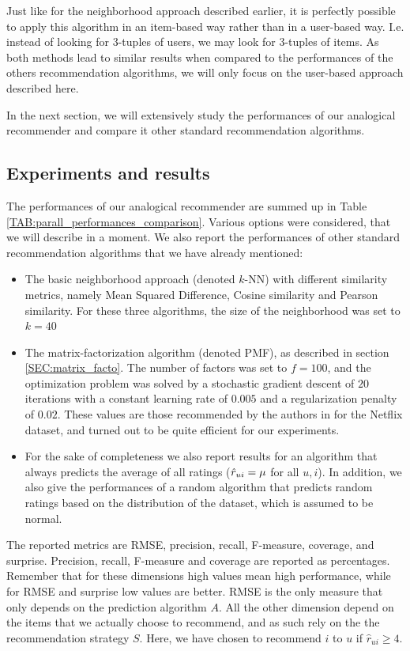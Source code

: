 Just like for the neighborhood approach described earlier, it is perfectly
possible to apply this algorithm in an item-based way rather
than in a user-based way. I.e. instead of looking for $3$-tuples of users, we
may look for $3$-tuples of items.  As both methods lead to similar results when
compared to
the performances of the others recommendation algorithms, we
will only focus on the user-based approach described here.

In the next section, we will extensively study the performances of our
analogical recommender and compare it other standard recommendation algorithms.

\subsection{Experiments and results}
\label{SEC:experiments_analogical_reco_basic}

The performances of our analogical recommender are summed up in Table
\ref{TAB:parall_performances_comparison}. Various options were considered, that
we will describe in a moment. We also report the performances of other standard
recommendation algorithms that we have already mentioned:
\begin{itemize}
  \item The basic neighborhood approach (denoted $k$-NN) with different
    similarity metrics, namely Mean Squared Difference, Cosine similarity and
    Pearson similarity.  For these three algorithms, the size of the
    neighborhood was set to $k=40$
  \item The matrix-factorization algorithm (denoted PMF), as described in section \ref{SEC:matrix_facto}.
    The number of factors was set to $f = 100$, and the optimization problem
    was solved by a stochastic gradient descent of $20$ iterations with
    a constant learning rate of $0.005$ and a regularization penalty of $0.02$.
    These values are those recommended by the authors in \cite{KorBel11} for the
    Netflix dataset, and turned out to be quite efficient for our experiments.
  \item For the sake of completeness we also report results for an algorithm
    that always predicts the average of all ratings ($\hat{r}_{ui} = \mu$ for all
    $u, i$). In addition, we also give the performances of a random algorithm
    that predicts random ratings based on the distribution of the dataset,
    which is assumed to be normal.
\end{itemize}

The reported metrics are RMSE, precision, recall, F-measure, coverage, and
surprise. Precision, recall, F-measure and coverage  are reported as
percentages. Remember that for these dimensions high values mean high
performance, while for RMSE and surprise low values are better.  RMSE is the
only measure that only depends on the prediction algorithm $A$. All the other
dimension depend on the items that we actually choose to recommend, and as such
rely on the the recommendation strategy $S$. Here, we have chosen to
recommend $i$ to $u$ if $\hat{r}_{ui} \geq 4$.


